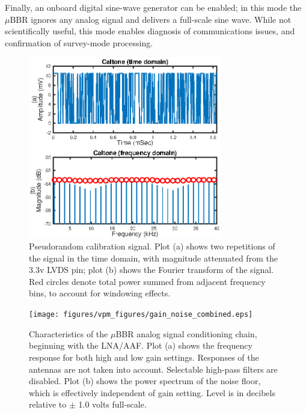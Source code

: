 Finally, an onboard digital sine-wave generator can be enabled; in this mode the $\mu$BBR ignores any analog signal and delivers a full-scale sine wave. While not scientifically useful, this mode enables diagnosis of communications issues, and confirmation of survey-mode processing.

\begin{figure}[ht]
\begin{center}
\includegraphics[width=20pc]{figures/vpm_figures/caltone.eps}

\caption[Pseudo-random calibration signals]{Pseudorandom calibration signal. Plot (a) shows two repetitions of the signal in the time domain, with magnitude attenuated from the 3.3v LVDS pin; plot (b) shows the Fourier transform of the signal. Red circles denote total power summed from adjacent frequency bins, to account for windowing effects.}
\label{fig:caltone}
\end{center}
\end{figure}

\begin{figure}[t]
\begin{center}
\texttt{[image: figures/vpm\_figures/gain\_noise\_combined.eps]}
\caption[Frequency response and noise floor of the $\mu$BBR analog processing chain]{Characteristics of the $\mu$BBR analog signal conditioning chain, beginning with the LNA/AAF.  Plot (a) shows the frequency response for both high and low gain settings. Responses of the antennas are not taken into account. Selectable high-pass filters are disabled. Plot (b) shows the power spectrum of the noise floor, which is effectively independent of gain setting. Level is in decibels relative to $\pm$ 1.0 volts full-scale.}
\label{fig:bbr_calibration}
\end{center}
\end{figure}



